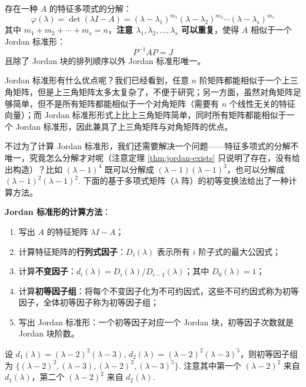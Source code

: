 \begin{theorem}
\label{thm:jordan-exists}
存在一种 $A$ 的特征多项式的分解：
\[
    \varphi(\lambda)=\det(\lambda I-A)=(\lambda-\lambda_1)^{m_1}(\lambda-\lambda_2)^{m_2}\cdots(\lambda-\lambda_s)^{m_s}
\]
其中 $m_1+m_2+\cdots+m_s=n$，\textbf{注意 $\lambda_1,\lambda_2,\ldots,\lambda_s$ 可以重复}，使得 $A$ 相似于一个 Jordan 标准形：
\[P^{-1}AP=J\]
且除了 Jordan 块的排列顺序以外 Jordan 标准形唯一。
\end{theorem}

Jordan 标准形有什么优点呢？我们已经看到，任意 $n$ 阶矩阵都能相似于一个上三角矩阵，但是上三角矩阵太多太复杂了，不便于研究；另一方面，虽然对角矩阵足够简单，但不是所有矩阵都能相似于一个对角矩阵（需要有 $n$ 个线性无关的特征向量）；而 Jordan 标准形形式上比上三角矩阵简单，同时所有矩阵都能相似于一个 Jordan 标准形，因此兼具了上三角矩阵与对角矩阵的优点。

不过为了计算 Jordan 标准形，我们还需要解决一个问题——特征多项式的分解不唯一，究竟怎么分解才对呢（注意定理 \ref{thm:jordan-exists} 只说明了存在，没有给出构造）？比如 $(\lambda-1)^4$ 既可以分解成 $(\lambda-1)(\lambda-1)^3$，也可以分解成 $(\lambda -1)^2(\lambda -1)^2$. 下面的基于多项式矩阵（$\lambda$ 阵）的初等变换法给出了一种计算方法。

\vskip 6pt \noindent\textbf{Jordan 标准形的计算方法}：

\begin{enumerate}
    \item 写出 $A$ 的特征矩阵 $\lambda I-A$；
    \item 计算特征矩阵的\textbf{行列式因子}：$D_i(\lambda)$ 表示所有 $i$ 阶子式的最大公因式；
    \item 计算\textbf{不变因子}：$d_i(\lambda)=D_i(\lambda)/D_{i-1}(\lambda)$；其中 $D_0(\lambda)=1$；
    \item 计算\textbf{初等因子组}：将每个不变因子化为不可约因式，这些不可约因式称为初等因子，全体初等因子称为初等因子组；
    \item 写出 Jordan 标准形：一个初等因子对应一个 Jordan 块，初等因子次数就是 Jordan 块阶数。
\end{enumerate}

\begin{example}
设 $d_1(\lambda)=(\lambda-2)^2(\lambda-3),\,d_2(\lambda)=(\lambda-2)^2(\lambda-3)^5$，则初等因子组为 $\{(\lambda-2)^2,(\lambda-3),(\lambda-2)^2,(\lambda-3)^5\}$.  注意其中第一个 $(\lambda-2)^2$ 来自 $d_1(\lambda)$，第二个 $(\lambda-2)^2$ 来自 $d_2(\lambda)$.
\end{example}

